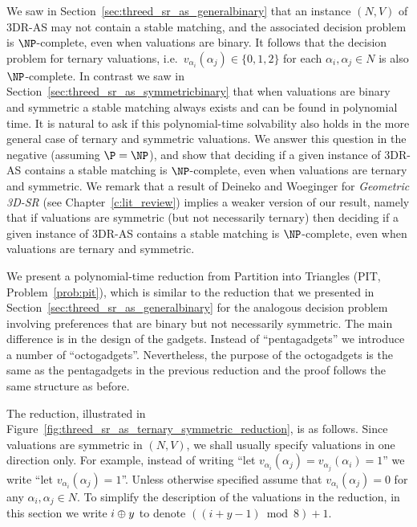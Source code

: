 We saw in Section~\ref{sec:threed_sr_as_generalbinary} that an instance $(N, V)$ of 3DR-AS may not contain a stable matching, and the associated decision problem is $\NP$-complete, even when valuations are binary. It follows that the decision problem for ternary valuations, i.e.\ $v_{\alpha_i}(\alpha_j) \in \{ 0, 1, 2 \}$ for each $\alpha_i, \alpha_j \in N$ is also $\NP$-complete. In contrast we saw in Section~\ref{sec:threed_sr_as_symmetricbinary} that when valuations are binary and symmetric a stable matching always exists and can be found in polynomial time. It is natural to ask if this polynomial-time solvability also holds in the more general case of ternary and symmetric valuations. We answer this question in the negative (assuming $\P=\NP$), and show that deciding if a given instance of 3DR-AS contains a stable matching is $\NP$-complete, even when valuations are ternary and symmetric. We remark that a result of Deineko and Woeginger \cite{DEINEKO20131837} for \emph{Geometric 3D-SR} (see Chapter~\ref{c:lit_review}) implies a weaker version of our result, namely that if valuations are symmetric (but not necessarily ternary) then deciding if a given instance of 3DR-AS contains a stable matching is $\NP$-complete, even when valuations are ternary and symmetric.


We present a polynomial-time reduction from Partition into Triangles (PIT, Problem~\ref{prob:pit}), which is similar to the reduction that we presented in Section~\ref{sec:threed_sr_as_generalbinary} for the analogous decision problem involving preferences that are binary but not necessarily symmetric. The main difference is in the design of the gadgets. Instead of ``pentagadgets'' we introduce a number of ``octogadgets''. Nevertheless, the purpose of the octogadgets is the same as the pentagadgets in the previous reduction and the proof follows the same structure as before.

The reduction, illustrated in Figure~\ref{fig:threed_sr_as_ternary_symmetric_reduction}, is as follows. Since valuations are symmetric in $(N, V)$, we shall usually specify valuations in one direction only. For example, instead of writing ``let $v_{\alpha_i}(\alpha_j)=v_{\alpha_j}(\alpha_i)=1$'' we write ``let $v_{\alpha_i}(\alpha_j)=1$''. Unless otherwise specified assume that $v_{\alpha_i}(\alpha_j)=0$ for any $\alpha_i, \alpha_j \in N$. To simplify the description of the valuations in the reduction, in this section we write $i \oplus y$ to denote $((i + y - 1) \bmod 8) + 1$.

